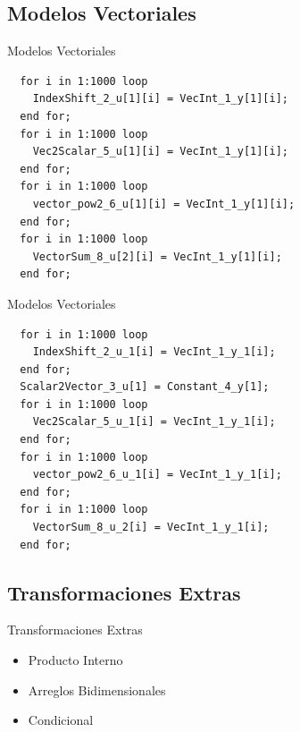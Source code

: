 \documentclass[10pt,handout]{beamer}
\begin{document}
	\subsection{Modelos Vectoriales}

\begin{frame}[fragile]{Modelos Vectoriales}
\begin{verbatim}
  for i in 1:1000 loop
    IndexShift_2_u[1][i] = VecInt_1_y[1][i];
  end for;
  for i in 1:1000 loop
    Vec2Scalar_5_u[1][i] = VecInt_1_y[1][i];
  end for;
  for i in 1:1000 loop
    vector_pow2_6_u[1][i] = VecInt_1_y[1][i];
  end for;
  for i in 1:1000 loop
    VectorSum_8_u[2][i] = VecInt_1_y[1][i];
  end for;
\end{verbatim}
\end{frame}

\begin{frame}[fragile]{Modelos Vectoriales}
\begin{verbatim}
  for i in 1:1000 loop
    IndexShift_2_u_1[i] = VecInt_1_y_1[i];
  end for;
  Scalar2Vector_3_u[1] = Constant_4_y[1];
  for i in 1:1000 loop
    Vec2Scalar_5_u_1[i] = VecInt_1_y_1[i];
  end for;
  for i in 1:1000 loop
    vector_pow2_6_u_1[i] = VecInt_1_y_1[i];
  end for;
  for i in 1:1000 loop
    VectorSum_8_u_2[i] = VecInt_1_y_1[i];
  end for;
\end{verbatim}
\end{frame}


	\subsection{Transformaciones Extras}

\begin{frame}{Transformaciones Extras}
\begin{itemize}
	\item<1-> Producto Interno
	\item<2-> Arreglos Bidimensionales
	\item<3-> Condicional
\end{itemize}
\end{frame}
\end{document}
